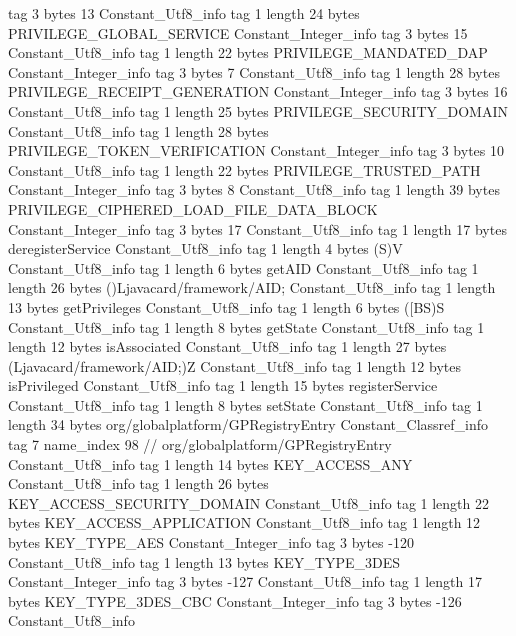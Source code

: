 {{{			tag	3
			bytes	13
		}
		Constant_Utf8_info {
			tag	1
			length	24
			bytes	PRIVILEGE_GLOBAL_SERVICE
		}
		Constant_Integer_info {
			tag	3
			bytes	15
		}
		Constant_Utf8_info {
			tag	1
			length	22
			bytes	PRIVILEGE_MANDATED_DAP
		}
		Constant_Integer_info {
			tag	3
			bytes	7
		}
		Constant_Utf8_info {
			tag	1
			length	28
			bytes	PRIVILEGE_RECEIPT_GENERATION
		}
		Constant_Integer_info {
			tag	3
			bytes	16
		}
		Constant_Utf8_info {
			tag	1
			length	25
			bytes	PRIVILEGE_SECURITY_DOMAIN
		}
		Constant_Utf8_info {
			tag	1
			length	28
			bytes	PRIVILEGE_TOKEN_VERIFICATION
		}
		Constant_Integer_info {
			tag	3
			bytes	10
		}
		Constant_Utf8_info {
			tag	1
			length	22
			bytes	PRIVILEGE_TRUSTED_PATH
		}
		Constant_Integer_info {
			tag	3
			bytes	8
		}
		Constant_Utf8_info {
			tag	1
			length	39
			bytes	PRIVILEGE_CIPHERED_LOAD_FILE_DATA_BLOCK
		}
		Constant_Integer_info {
			tag	3
			bytes	17
		}
		Constant_Utf8_info {
			tag	1
			length	17
			bytes	deregisterService
		}
		Constant_Utf8_info {
			tag	1
			length	4
			bytes	(S)V
		}
		Constant_Utf8_info {
			tag	1
			length	6
			bytes	getAID
		}
		Constant_Utf8_info {
			tag	1
			length	26
			bytes	()Ljavacard/framework/AID;
		}
		Constant_Utf8_info {
			tag	1
			length	13
			bytes	getPrivileges
		}
		Constant_Utf8_info {
			tag	1
			length	6
			bytes	([BS)S
		}
		Constant_Utf8_info {
			tag	1
			length	8
			bytes	getState
		}
		Constant_Utf8_info {
			tag	1
			length	12
			bytes	isAssociated
		}
		Constant_Utf8_info {
			tag	1
			length	27
			bytes	(Ljavacard/framework/AID;)Z
		}
		Constant_Utf8_info {
			tag	1
			length	12
			bytes	isPrivileged
		}
		Constant_Utf8_info {
			tag	1
			length	15
			bytes	registerService
		}
		Constant_Utf8_info {
			tag	1
			length	8
			bytes	setState
		}
		Constant_Utf8_info {
			tag	1
			length	34
			bytes	org/globalplatform/GPRegistryEntry
		}
		Constant_Classref_info {
			tag	7
			name_index	98		// org/globalplatform/GPRegistryEntry
		}
		Constant_Utf8_info {
			tag	1
			length	14
			bytes	KEY_ACCESS_ANY
		}
		Constant_Utf8_info {
			tag	1
			length	26
			bytes	KEY_ACCESS_SECURITY_DOMAIN
		}
		Constant_Utf8_info {
			tag	1
			length	22
			bytes	KEY_ACCESS_APPLICATION
		}
		Constant_Utf8_info {
			tag	1
			length	12
			bytes	KEY_TYPE_AES
		}
		Constant_Integer_info {
			tag	3
			bytes	-120
		}
		Constant_Utf8_info {
			tag	1
			length	13
			bytes	KEY_TYPE_3DES
		}
		Constant_Integer_info {
			tag	3
			bytes	-127
		}
		Constant_Utf8_info {
			tag	1
			length	17
			bytes	KEY_TYPE_3DES_CBC
		}
		Constant_Integer_info {
			tag	3
			bytes	-126
		}
		Constant_Utf8_info {
}}}
